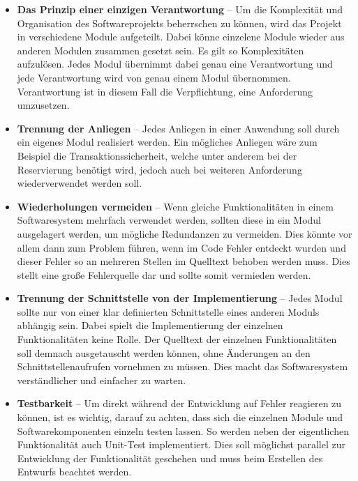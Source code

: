 			\begin{itemize}
				\item \textbf{Das Prinzip einer einzigen Verantwortung} -- Um die Komplexität und Organisation des Softwareprojekts beherrschen zu können, wird das Projekt in verschiedene Module aufgeteilt. Dabei könne einzelene Module wieder aus anderen Modulen zusammen gesetzt sein. Es gilt so Komplexitäten aufzulösen. Jedes Modul übernimmt dabei genau eine Verantwortung und jede Verantwortung wird von genau einem Modul übernommen. Verantwortung ist in diesem Fall die Verpflichtung, eine Anforderung umzusetzen. \autocite[Vgl.][]{Lahres.2015}
				
				\item \textbf{Trennung der Anliegen} -- Jedes Anliegen in einer Anwendung soll durch ein eigenes Modul realisiert werden. Ein mögliches Anliegen wäre zum Beispiel die Transaktionssicherheit, welche unter anderem bei der Reservierung benötigt wird, jedoch auch bei weiteren Anforderung wiederverwendet werden soll.\autocite[Vgl.][]{Lahres.2015} 
				
				\item \textbf{Wiederholungen vermeiden} -- Wenn gleiche Funktionalitäten in einem Softwaresystem mehrfach verwendet werden, sollten diese in ein Modul ausgelagert werden, um mögliche Redundanzen zu vermeiden. Dies könnte vor allem dann zum Problem führen, wenn im Code Fehler entdeckt wurden und dieser Fehler so an mehreren Stellen im Quelltext behoben werden muss. Dies stellt eine große Fehlerquelle dar und sollte somit vermieden werden.\autocite[Vgl.][]{Lahres.2015}
				 
				\item \textbf{Trennung der Schnittstelle von der Implementierung} -- Jedes Modul sollte nur von einer klar definierten Schnittstelle eines anderen Moduls abhängig sein. Dabei spielt die Implementierung der einzelnen Funktionalitäten keine Rolle. Der Quelltext der einzelnen Funktionalitäten soll demnach ausgetauscht werden können, ohne Änderungen an den Schnittstellenaufrufen vornehmen zu müssen. Dies macht das Softwaresystem verständlicher und einfacher zu warten.\autocite[Vgl.][]{Lahres.2015} 
				
				\item \textbf{Testbarkeit} -- Um direkt während der Entwicklung auf Fehler reagieren zu können, ist es wichtig, darauf zu achten, dass sich die einzelnen Module und Softwarekomponenten einzeln testen lassen. So werden neben der eigentlichen Funktionalität auch Unit-Test implementiert. Dies soll möglichst parallel zur Entwicklung der Funktionalität geschehen und muss beim Erstellen des Entwurfs beachtet werden.\autocite[Vgl.][]{Lahres.2015} 
			\end{itemize} 
		
